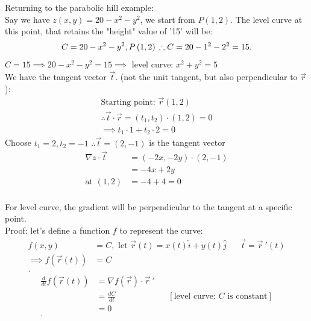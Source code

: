 \begin{itemize}
\begin{example}
	Returning to the parabolic hill example: \\
	Say we have $z\left( x,y \right)  = 20 - x^2 - y^2$, we start from $P\left( 1,2 \right) $. The level curve at this point, that retains the "height" value of '15' will be:
	\[
	 C = 20-x^2 - y^2, P\left( 1,2 \right) \\
	 \therefore  C = 20-1^2-2^2 = 15
	.\] 
	$C = 15 \implies 20 - x^2 - y^2 = 15 \implies$ level curve: $x^2 + y^2 =5$ \\
	We have the tangent vector $\vec{t}$. (not the unit tangent, but also perpendicular to $\vec{r}$):
	\begin{align*}
	\text{Starting point: }	\vec{r}\left( 1,2 \right)  \\
		\therefore  \vec{t} \cdot  \vec{r} = \left( t_1,t_2 \right) \cdot  \left(1,2  \right)  =  0 \\
		\implies t_1\cdot 1+t_2 \cdot 2 = 0
	\end{align*}
	Choose $t_1 = 2, t_2 = -1$ $\therefore \vec{t} = \left( 2,-1 \right) $ is the tangent vector
	\begin{align*}
		\nabla z \cdot  \vec{t} &=  \left( -2x, -2y \right)  \cdot  \left( 2,-1 \right)  \\
	&= -4x + 2y \\
	\text{at }\left( 1,2 \right)  &=  -4+4 = 0 \\
	\end{align*}
\end{example}
\begin{theorem}
	For level curve, the gradient will be perpendicular to the tangent at a specific point. \\
	Proof: let's define a function $f$ to represent the curve:
	 \begin{align*}
		 f\left( x,y \right)  &= C, \text{ let }\vec{r}\left( t \right)  = x\left( t \right) \hat{i} + y\left( t \right) \hat{j} && \vec{t} = \vec{r}~'\left( t \right) \\
		\implies f\left( \vec{r}\left( t \right)  \right)  &=  C \\
	.\end{align*}
	\begin{align*}
		\frac{d}{dt}f\left( \vec{r}\left( t \right)  \right)  &=  \nabla f\left( \vec{r} \right)  \cdot  \vec{r}~' \\
															  &= \frac{dC}{dt} && [\text{level curve: $C$ is constant}]\\
		&= 0 \\
	.\end{align*}

\end{theorem}
\end{itemize}
